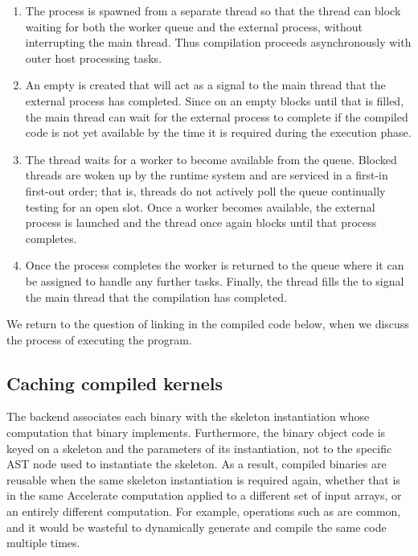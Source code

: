 \begin{enumerate}
\item The process is spawned from a separate thread so that the thread can block
    waiting for both the worker queue and the external process, without
    interrupting the main thread. Thus compilation proceeds asynchronously with
    outer host processing tasks.

\item An empty  is created that will act as a signal to the main
    thread that the external process has completed. Since  on an
    empty  blocks until that  is filled, the main thread
    can wait for the external process to complete if the compiled code is not
    yet available by the time it is required during the execution phase.

\item The thread waits for a worker to become available from the queue. Blocked
    threads are woken up by the runtime system and are serviced in a first-in
    first-out order; that is, threads do not actively poll the queue continually
    testing for an open slot. Once a worker becomes available, the external
    process is launched and the thread once again blocks until that process
    completes.

\item Once the process completes the worker is returned to the queue where it
    can be assigned to handle any further tasks. Finally, the thread fills the
     to signal the main thread that the compilation has completed.
\end{enumerate}

We return to the question of linking in the compiled code below, when we discuss
the process of executing the program.


\subsection{Caching compiled kernels}
\label{sec:caching_compiled_kernels}

The \CUDA backend associates each \CUDA binary with the skeleton instantiation
whose computation that binary implements. Furthermore, the binary object code is
keyed on a skeleton and the parameters of its instantiation, not to the specific
AST node used to instantiate the skeleton. As a result, compiled binaries are
reusable when the same skeleton instantiation is required again, whether that is
in the same Accelerate computation applied to a different set of input arrays,
or an entirely different computation. For example, operations such as
 are common, and it would be wasteful to dynamically generate
and compile the same code multiple times.

